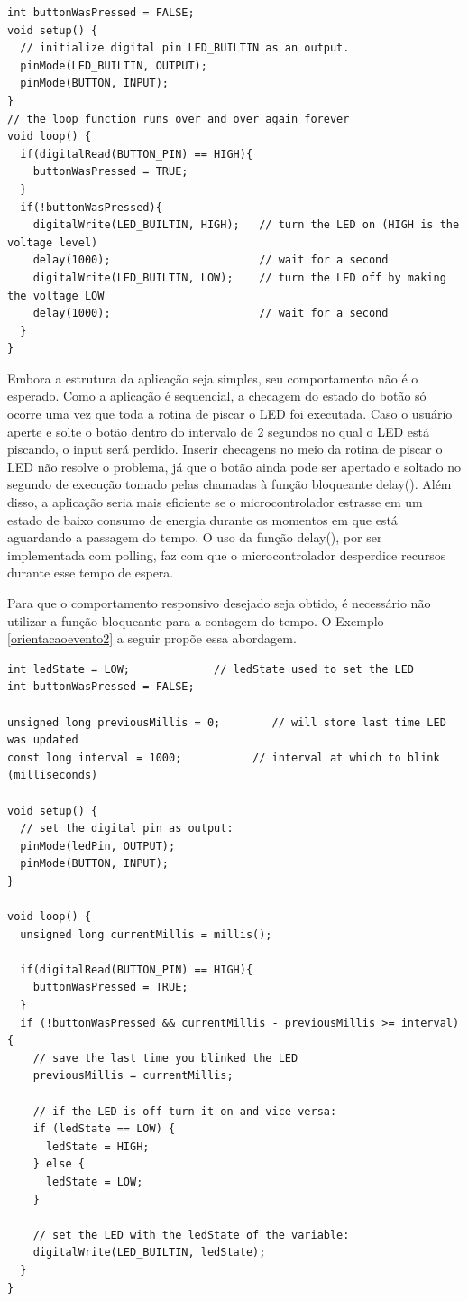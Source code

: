 \documentclass{article}
\begin{document}
\begin{lstlisting}[style=CStyle,label=orientacaoevento1,caption=Aplicação bloqueante]
int buttonWasPressed = FALSE;
void setup() {
  // initialize digital pin LED_BUILTIN as an output.
  pinMode(LED_BUILTIN, OUTPUT);
  pinMode(BUTTON, INPUT);
}
// the loop function runs over and over again forever
void loop() {
  if(digitalRead(BUTTON_PIN) == HIGH){
    buttonWasPressed = TRUE;
  }
  if(!buttonWasPressed){ 
    digitalWrite(LED_BUILTIN, HIGH);   // turn the LED on (HIGH is the voltage level)
    delay(1000);                       // wait for a second
    digitalWrite(LED_BUILTIN, LOW);    // turn the LED off by making the voltage LOW
    delay(1000);                       // wait for a second
  }
}
\end{lstlisting}
\par Embora a estrutura da aplicação seja simples, seu comportamento não é o esperado. Como a aplicação é sequencial, a checagem do estado do botão só ocorre uma vez que toda a rotina de piscar o LED foi executada. Caso o usuário aperte e solte o botão dentro do intervalo de 2 segundos no qual o LED está piscando, o input será perdido. Inserir checagens no meio da rotina de piscar o LED não resolve o problema, já que o botão ainda pode ser apertado e soltado no segundo de execução tomado pelas chamadas à função bloqueante delay(). Além disso, a aplicação seria mais eficiente se o microcontrolador estrasse em um estado de baixo consumo de energia durante os momentos em que está aguardando a passagem do tempo. O uso da função delay(), por ser implementada com polling, faz com que o microcontrolador desperdice recursos durante esse tempo de espera.
\par Para que o comportamento responsivo desejado seja obtido, é necessário não utilizar a função bloqueante para a contagem do tempo. O Exemplo \ref{orientacaoevento2} a seguir propõe essa abordagem.
\begin{lstlisting}[style=CStyle,label=orientacaoevento2,caption=Aplicação não bloqueante]
int ledState = LOW;             // ledState used to set the LED
int buttonWasPressed = FALSE;

unsigned long previousMillis = 0;        // will store last time LED was updated
const long interval = 1000;           // interval at which to blink (milliseconds)

void setup() {
  // set the digital pin as output:
  pinMode(ledPin, OUTPUT);
  pinMode(BUTTON, INPUT);
}

void loop() {
  unsigned long currentMillis = millis();

  if(digitalRead(BUTTON_PIN) == HIGH){
    buttonWasPressed = TRUE;
  }
  if (!buttonWasPressed && currentMillis - previousMillis >= interval) {
    // save the last time you blinked the LED
    previousMillis = currentMillis;

    // if the LED is off turn it on and vice-versa:
    if (ledState == LOW) {
      ledState = HIGH;
    } else {
      ledState = LOW;
    }

    // set the LED with the ledState of the variable:
    digitalWrite(LED_BUILTIN, ledState);
  }
}
\end{lstlisting}
\end{document}
